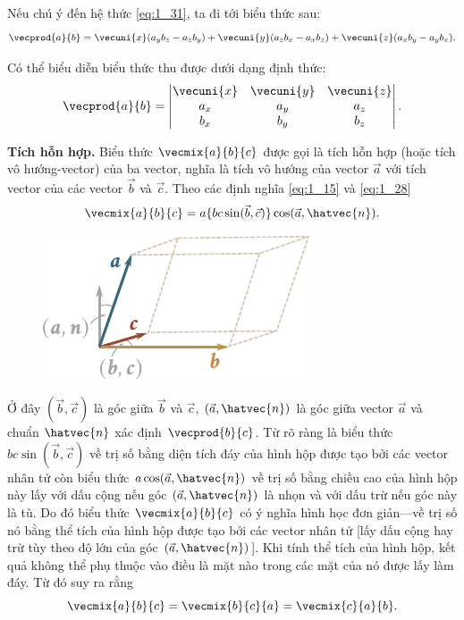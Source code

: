 \noindent
Nếu chú ý đến hệ thức \eqref{eq:1_31}, ta đi tới biểu thức sau:
\begin{equation}\label{eq:1_32}
\vecprod{a}{b} = \vecuni{x}(a_yb_z - a_zb_y) + \vecuni{y}(a_zb_x - a_xb_z) + \vecuni{z}(a_xb_y - a_yb_x).
\end{equation}

\noindent
Có thể biểu diễn biểu thức thu được dưới dạng định thức:
\vspace{-12pt}
\begin{equation}\label{eq:1_33}
\vecprod{a}{b} = \begin{vmatrix}
\vecuni{x} & \vecuni{y} & \vecuni{z}\\
a_x & a_y & a_z\\
b_x & b_y & b_z
\end{vmatrix}.
\end{equation}

\textbf{Tích hỗn hợp.} Biểu thức $\vecmix{a}{b}{c}$ được gọi là tích hỗn hợp (hoặc tích vô hướng-vector) của ba vector, nghĩa là tích vô hướng của vector $\vec{a}$ với tích vector của các vector $\vec{b}$ và $\vec{c}$. Theo các định nghĩa \eqref{eq:1_15} và \eqref{eq:1_28}
\begin{equation*}
\vecmix{a}{b}{c} = a\{bc\sin(\vec{b}, \vec{c})\}\cos(\vec{a},\hatvec{n}).
\end{equation*}

\begin{figure}[!htb]
	\begin{center}
		\includegraphics[scale=1]{figures/ch_01/fig_1_18.pdf}
		\caption[]{}
		\label{fig:1_18}
	\end{center}
\end{figure}

\noindent
Ở đây $(\vec{b},\vec{c})$ là góc giữa $\vec{b}$ và $\vec{c}$, $(\vec{a},\hatvec{n})$ là góc giữa vector $\vec{a}$ và chuẩn $\hatvec{n}$ xác định $\vecprod{b}{c}$. Từ  rõ ràng là biểu thức $bc\sin(\vec{b},\vec{c})$ về trị số bằng diện tích đáy của hình hộp được tạo bởi các vector nhân tử còn biểu thức $a\cos(\vec{a},\hatvec{n})$ về trị số bằng chiều cao của hình hộp này lấy với dấu cộng nếu góc $(\vec{a},\hatvec{n})$ là nhọn và với dấu trừ nếu góc này là tù. Do đó biểu thức $\vecmix{a}{b}{c}$ có ý nghĩa hình học đơn giản---về trị số nó bằng thể tích của hình hộp được tạo bởi các vector nhân tử [lấy dấu cộng hay trừ tùy theo độ lớn của góc $(\vec{a},\hatvec{n})$]. Khi tính thể tích của hình hộp, kết quả không thể phụ thuộc vào điều là mặt nào trong các mặt của nó được lấy làm đáy. Từ đó suy ra rằng
\begin{equation}\label{eq:1_34}
\vecmix{a}{b}{c} = \vecmix{b}{c}{a} = \vecmix{c}{a}{b}.
\end{equation}


